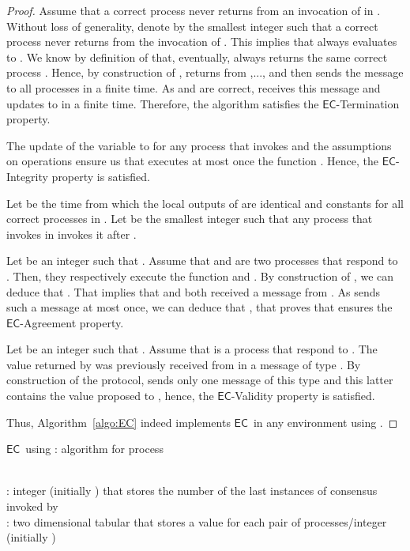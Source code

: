 \documentclass[11pt]{article}
\newcommand{\EC}{\ensuremath{\mathsf{EC}}}
\begin{document}
{\begin{proof}
Assume that a correct process never returns from an invocation of
 in . Without loss of generality, denote by
 the smallest integer such that a correct process  never
returns from the invocation of . This implies
that  always evaluates  to
. We know by definition of  that, eventually, 
always returns the same correct process . Hence, by construction
of ,  returns from ,...,
 and then sends the message
 to all processes in a finite time. As  and
 are correct,  receives this message and updates
 to  in a finite time. Therefore, the
algorithm satisfies the \EC-Termination property.

The update of the variable  to  for any process 
that invokes  and the assumptions on operations
 ensure us that  executes at most once the
function \linebreak . Hence, the
\EC-Integrity property is satisfied.

Let  be the time from which the local outputs of 
are identical and constants for all correct processes in . Let 
be the smallest integer such that any process that invokes
 in  invokes it after .

Let  be an integer such that . Assume that  and
 are two processes that respond to . Then,
they respectively execute the function
 and
. By construction of , we
can deduce that . That implies that  and
 both received a message  from . As 
sends such a message at most once, we can deduce that
, that proves that ensures
the \EC-Agreement property.

Let  be an integer such that . Assume that  is
a process that respond to . The value returned
by  was previously received from  in a message of type
. By construction of the protocol,  sends only one
message of this type and this latter contains the value proposed to
, hence, the \EC-Validity property is satisfied.

Thus, Algorithm~\ref{algo:EC} indeed implements \EC~in any
environment using .
\end{proof}

\begin{algorithm}
\caption{\EC~using : algorithm for process }\label{algo:EC}
\small
\begin{description}\itemsep0pt
\item[Local variables:]~\\
: integer (initially ) that stores the number of the last instances of consensus invoked by \\
: two dimensional tabular that stores a value for each pair of processes/integer (initially )


\end{description}
\end{algorithm}}
\end{document}
